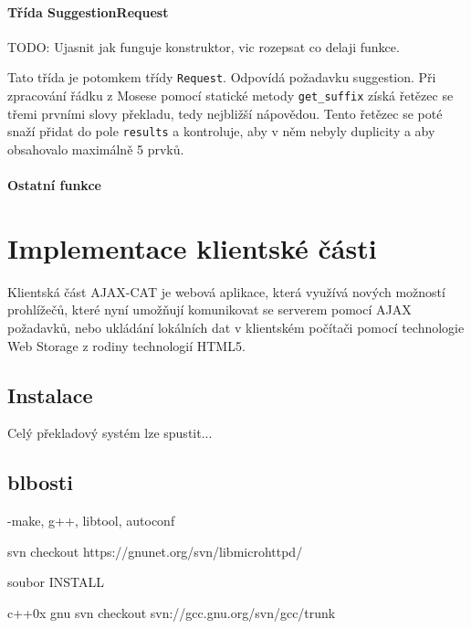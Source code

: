 \documentclass[12pt,a4paper]{report}
\begin{document}
\subsubsection{Třída SuggestionRequest}
TODO: Ujasnit jak funguje konstruktor, vic rozepsat co delaji funkce.

Tato třída je potomkem třídy {\tt Request}. Odpovídá požadavku suggestion. Při zpracování řádku z Mosese pomocí statické metody {\tt get\_suffix} získá řetězec se třemi prvními slovy překladu, tedy nejbližší nápovědou. Tento řetězec se poté snaží přidat do pole {\tt results} a kontroluje, aby v něm nebyly duplicity a aby obsahovalo maximálně 5 prvků.

\subsubsection{Ostatní funkce}

\chapter{Implementace klientské části}

Klientská část AJAX-CAT je webová aplikace, která využívá nových možností prohlížečů, které nyní umožňují komunikovat se serverem pomocí AJAX požadavků, nebo ukládání lokálních dat v klientském počítači pomocí technologie Web Storage z rodiny technologií HTML5. 

\section{Instalace}
Celý překladový systém lze spustit...



\section{blbosti}

-make, g++, libtool, autoconf

svn checkout https://gnunet.org/svn/libmicrohttpd/

soubor INSTALL

c++0x gnu svn checkout svn://gcc.gnu.org/svn/gcc/trunk



% 




\end{document}
